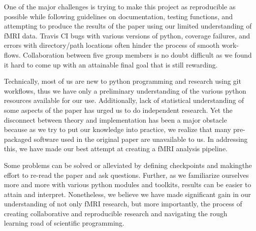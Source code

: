 \documentclass[11pt]{article}
\begin{document}
\par \indent One of the major challenges is trying to make this project as 
reproducible as possible while following guidelines on documentation, testing 
functions, and attempting to produce the results of the paper using our limited
understanding of fMRI data. Travis CI bugs with various versions of python, 
coverage failures, and errors with directory/path locations often hinder the 
process of smooth work-flows. Collaboration between five group members is no 
doubt difficult as we found it hard to come up with an attainable final goal 
that is still rewarding. 
\par Technically, most of us are new to python programming and research using 
git workflows, thus we have only a preliminary understanding of the various 
python resources available for our use. Additionally, lack of statistical 
understanding of some aspects of the paper has urged us to do independent 
research. Yet the disconnect between theory and implementation has been a major 
obstacle because as we try to put our knowledge into practice, we realize that
many pre-packaged software used in the original paper are unavailable to us. 
In addressing this, we have made our best attempt at creating a fMRI analysis 
pipeline. 
\par Some problems can be solved or alleviated by defining checkpoints and 
makingthe effort to re-read the paper and ask questions. Further, as we 
familiarize ourselves more and more  with various python modules and toolkits, 
results can be easier to attain and interpret. Nonetheless, we believe we have 
made significant gain in our understanding of not only fMRI research, but more 
importantly, the process of creating collaborative and reproducible research and
navigating the rough learning road of scientific programming. 



\end{document}
